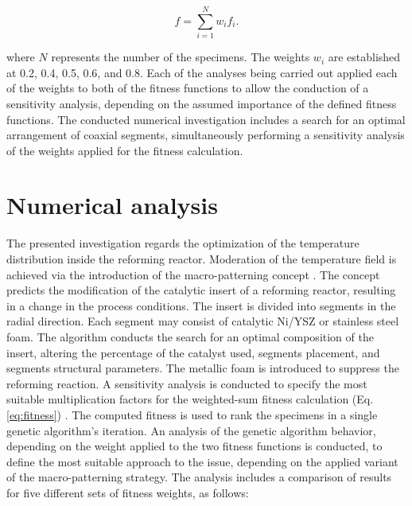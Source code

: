 \documentclass[preprint,12pt]{elsarticle}
\begin{document}
\begin{equation}
\label{eq:fitness}
f = \sum_{i = 1}^{N} w_{i}f_{i}.
\end{equation}

\noindent where $N$ represents the number of the specimens. The weights $w_{i}$ are established at 0.2, 0.4, 0.5, 0.6, and 0.8. Each of the analyses being carried out applied each of the weights to both of the fitness functions to allow the conduction of a sensitivity analysis, depending on the assumed importance of the defined fitness functions. The conducted numerical investigation includes a search for an optimal arrangement of coaxial segments, simultaneously performing a sensitivity analysis of the weights applied for the fitness calculation.

\clearpage








\section{Numerical analysis}
\label{sec:num_analysis}

The presented investigation regards the optimization of the temperature distribution inside the reforming reactor. Moderation of the temperature field is achieved via the introduction of the macro-patterning concept \cite{Pajak2018}. The concept predicts the modification of the catalytic insert of a reforming reactor, resulting in a change in the process conditions. The insert is divided into segments in the radial direction. Each segment may consist of catalytic Ni/YSZ or stainless steel foam. The algorithm conducts the search for an optimal composition of the insert, altering the percentage of the catalyst used, segments placement, and segments structural parameters.  The metallic foam is introduced to suppress the reforming reaction. A sensitivity analysis is conducted to specify the most suitable multiplication factors for the weighted-sum fitness calculation (Eq. \eqref{eq:fitness}) \cite{Davahli2022}. The computed fitness is used to rank the specimens in a single genetic algorithm's iteration. An analysis of the genetic algorithm behavior, depending on the weight applied to the two fitness functions is conducted, to define the most suitable approach to the issue, depending on the applied variant of the macro-patterning strategy. The analysis includes a comparison of results for five different sets of fitness weights, as follows:
\end{document}
